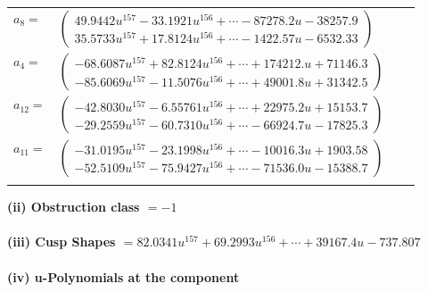 \documentclass[1p]{elsarticle_modified}
\theoremstyle{definition}
\begin{document}
\begin{tabular}{m{7pt} m{180pt} m{7pt} m{180pt} }
\flushright $a_{8}=$&$\begin{pmatrix}49.9442 u^{157}-33.1921 u^{156}+\cdots-87278.2 u-38257.9\\35.5733 u^{157}+17.8124 u^{156}+\cdots-1422.57 u-6532.33\end{pmatrix}$ \\
\flushright $a_{4}=$&$\begin{pmatrix}-68.6087 u^{157}+82.8124 u^{156}+\cdots+174212. u+71146.3\\-85.6069 u^{157}-11.5076 u^{156}+\cdots+49001.8 u+31342.5\end{pmatrix}$ \\
\flushright $a_{12}=$&$\begin{pmatrix}-42.8030 u^{157}-6.55761 u^{156}+\cdots+22975.2 u+15153.7\\-29.2559 u^{157}-60.7310 u^{156}+\cdots-66924.7 u-17825.3\end{pmatrix}$ \\
\flushright $a_{11}=$&$\begin{pmatrix}-31.0195 u^{157}-23.1998 u^{156}+\cdots-10016.3 u+1903.58\\-52.5109 u^{157}-75.9427 u^{156}+\cdots-71536.0 u-15388.7\end{pmatrix}$\\&\end{tabular}
\flushleft \textbf{(ii) Obstruction class $= -1$}\\~\\
\flushleft \textbf{(iii) Cusp Shapes $= 82.0341 u^{157}+69.2993 u^{156}+\cdots+39167.4 u-737.807$}\\~\\
\newpage\renewcommand{\arraystretch}{1}
\flushleft \textbf{(iv) u-Polynomials at the component}\newline \\
\end{document}
